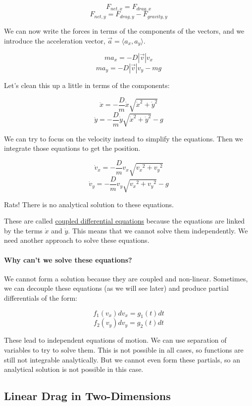 \documentclass[11pt]{article}
\begin{document}
\[F_{net,x} =  F_{drag,x}\] \[F_{net,y} =  F_{drag,y}-F_{gravity,y}\]

We can now write the forces in terms of the components of the vectors,
and we introduce the acceleration vector,
\(\vec{a} = \langle a_x, a_y \rangle\).

\[m a_x = -D |\vec{v}| v_x\] \[m a_y = -D |\vec{v}| v_y - mg\]

Let's clean this up a little in terms of the components:

\[\ddot{x} = -\frac{D}{m}  \dot{x}\sqrt{\dot{x}^2 + \dot{y}^2}\]
\[\ddot{y} = -\frac{D}{m} \dot{y}\sqrt{\dot{x}^2 + \dot{y}^2} - g\]

We can try to focus on the velocity instead to simplify the equations.
Then we integrate those equations to get the position.

\[\dot{v}_x = -\frac{D}{m}  {v_x}\sqrt{{v_x}^2 + {v_y}^2}\]
\[\dot{v}_y = -\frac{D}{m} {v_y}\sqrt{{v_x}^2 + {v_y}^2} - g\]

Rats! There is no analytical solution to these equations.

These are called
\href{https://math.libretexts.org/Bookshelves/Differential_Equations/Differential_Equations_(Chasnov)/07:_Systems_of_Equations/7.02:_Coupled_First-Order_Equations}{coupled
differential equations} because the equations are linked by the terms
\(\dot{x}\) and \(\dot{y}\). This means that we cannot solve them
independently. We need another approach to solve these equations.

\paragraph{Why can't we solve these
equations?}\label{why-cant-we-solve-these-equations}

We cannot form a solution because they are coupled and non-linear.
Sometimes, we can decouple these equations (as we will see later) and
produce partial differentials of the form:

\[f_1(v_x)dv_x = g_1(t)dt\] \[f_2(v_y)dv_y = g_2(t)dt\]

These lead to independent equations of motion. We can use separation of
variables to try to solve them. This is not possible in all cases, so
functions are still not integrable analytically. But we cannot even form
these partials, so an analytical solution is not possible in this case.

    \subsection{Linear Drag in
Two-Dimensions}\label{linear-drag-in-two-dimensions}
\end{document}
